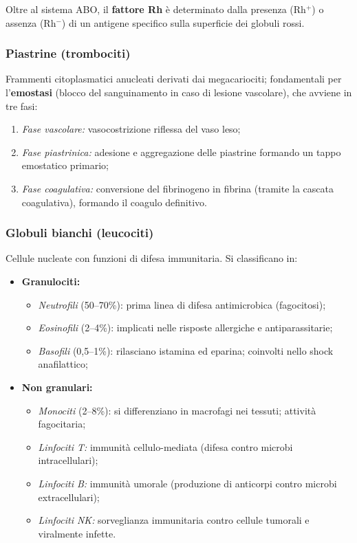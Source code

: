 \documentclass[11pt,a4paper,openright,twoside]{book}
\theoremstyle{definition}
\theoremstyle{plain}
\theoremstyle{remark}
\begin{document}
Oltre al sistema ABO, il \textbf{fattore Rh} è determinato dalla presenza (Rh$^+$) o assenza (Rh$^-$) di un antigene specifico sulla superficie dei globuli rossi.

\subsubsection{Piastrine (trombociti)}
Frammenti citoplasmatici anucleati derivati dai megacariociti; fondamentali per l'\textbf{emostasi} (blocco del sanguinamento in caso di lesione vascolare), che avviene in tre fasi:
\begin{enumerate}
  \item \textit{Fase vascolare:} vasocostrizione riflessa del vaso leso;
  \item \textit{Fase piastrinica:} adesione e aggregazione delle piastrine formando un tappo emostatico primario;
  \item \textit{Fase coagulativa:} conversione del fibrinogeno in fibrina (tramite la cascata coagulativa), formando il coagulo definitivo.
\end{enumerate}

\subsubsection{Globuli bianchi (leucociti)}
Cellule nucleate con funzioni di difesa immunitaria. Si classificano in:
\begin{itemize}
  \item \textbf{Granulociti:}
    \begin{itemize}
      \item \textit{Neutrofili} (50--70\%): prima linea di difesa antimicrobica (fagocitosi);
      \item \textit{Eosinofili} (2--4\%): implicati nelle risposte allergiche e antiparassitarie;
      \item \textit{Basofili} (0,5--1\%): rilasciano istamina ed eparina; coinvolti nello shock anafilattico;
    \end{itemize}
  \item \textbf{Non granulari:}
    \begin{itemize}
      \item \textit{Monociti} (2--8\%): si differenziano in macrofagi nei tessuti; attività fagocitaria;
      \item \textit{Linfociti T:} immunità cellulo-mediata (difesa contro microbi intracellulari);
      \item \textit{Linfociti B:} immunità umorale (produzione di anticorpi contro microbi extracellulari);
      \item \textit{Linfociti NK:} sorveglianza immunitaria contro cellule tumorali e viralmente infette.
    \end{itemize}
\end{itemize}
\end{document}
